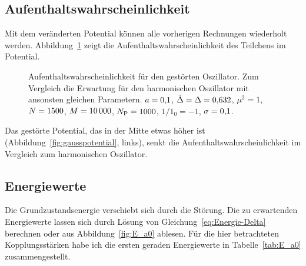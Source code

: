 \subsection{Aufenthaltswahrscheinlichkeit}

Mit dem veränderten Potential können alle vorherigen Rechnungen wiederholt
werden. Abbildung~\ref{fig:histogram_gauss} zeigt die
Aufenthaltswahrscheinlichkeit des Teilchens im Potential.

\begin{figure}[htbp]
    \centering
    \caption{%
        Aufenthaltswahrscheinlichkeit für den gestörten Oszillator. Zum
        Vergleich die Erwartung für den harmonischen Oszillator mit ansonsten
        gleichen Parametern. $a = \num{0.1}$, $\tilde \Delta =
        \Delta = \num{0.632}$, $\mu^2 = \num{1}$, $N = \num{1500}$,
        $M = \num{10000}$, $N_\text P = \num{1000}$, $1/1_0 =
        \num{-1}$, $\sigma = \num{0.1}$.
    }
    \label{fig:histogram_gauss}
\end{figure}

Das gestörte Potential, das in der Mitte etwas höher ist
(Abbildung~\ref{fig:gausspotential}, links), senkt die
Aufenthaltswahrscheinlichkeit im Vergleich zum harmonischen Oszillator.

\subsection{Energiewerte}

Die Grundzustandsenergie verschiebt sich durch die Störung. Die zu erwartenden
Energiewerte lassen sich durch Lösung von Gleichung~\eqref{eq:Energie-Delta}
berechnen oder aus Abbildung~\ref{fig:E_a0} ablesen. Für die hier betrachteten
Kopplungsstärken habe ich die ersten geraden Energiewerte in
Tabelle~\ref{tab:E_a0} zusammengestellt.


